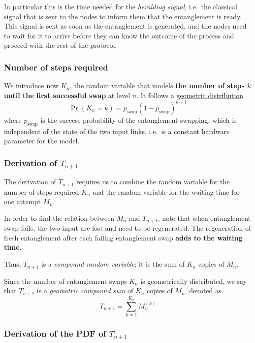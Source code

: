 \documentclass{masterthesis}
\begin{document}
In particular this is the time needed for the \textit{heralding signal}, i.e.\ the classical signal that is sent to the nodes to inform them that the entanglement is ready. This signal is sent as soon as the entanglement is generated, and the nodes need to wait for it to arrive before they can know the outcome of the process and proceed with the rest of the protocol.

\subsubsection*{Number of steps required}

We introduce now $K_n$, the random variable that models \textbf{the number of steps $k$ until the first successful swap} at level $n$. It follows a \hyperref[subsection:geometric_pdf]{geometric distribution}
\begin{equation}\label{eq:pdf_swap_steps}
    \Pr(K_n = k) = p_\text{swap} {(1 - p_\text{swap})}^{k-1}
\end{equation}
where $p_\text{swap}$ is the success probability of the entanglement swapping, which is independent of the state of the two input links, i.e.\ is a constant hardware parameter for the model.

\subsubsection*{Derivation of $T_{n+1}$}
The derivation of $T_{n+1}$ requires us to combine the random variable for the number of steps required $K_n$ and the random variable for the waiting time for one attempt $M_n$.

In order to find the relation between $M_n$ and $T_{n+1}$, note that when entanglement swap fails, the two input are lost and need to be
regenerated. The regeneration of fresh entanglement after each failing entanglement swap \textbf{adds to the waiting time}. 

Thus, $T_{n+1}$ is a \textit{compound random variable}: it is the sum of $K_n$ copies of $M_n$. 

Since the number of entanglement swaps $K_n$ is geometrically distributed, we say that $T_{n+1}$ is a \textit{geometric compound sum} of $K_n$ copies of $M_n$, denoted as
\begin{equation}
    T_{n+1}=\sum_{k=1}^{K_{n}} M_{n}^{(k)}
\end{equation}

\subsubsection*{Derivation of the PDF of $T_{n+1}$}
\end{document}
